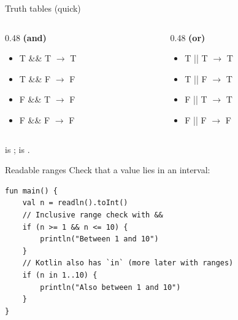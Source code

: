 \documentclass[aspectratio=169,11pt]{beamer}
\begin{document}
    \begin{frame}{Truth tables (quick)}
        \begin{columns}[T]
            \begin{column}{0.48\textwidth}
                \textbf{\kotlincode{\&\&} (and)}
                \begin{itemize}
                    \item T \&\& T $\rightarrow$ T
                    \item T \&\& F $\rightarrow$ F
                    \item F \&\& T $\rightarrow$ F
                    \item F \&\& F $\rightarrow$ F
                \end{itemize}
            \end{column}
            \begin{column}{0.48\textwidth}
                \textbf{\kotlincode{||} (or)}
                \begin{itemize}
                    \item T || T $\rightarrow$ T
                    \item T || F $\rightarrow$ T
                    \item F || T $\rightarrow$ T
                    \item F || F $\rightarrow$ F
                \end{itemize}
            \end{column}
        \end{columns}
        \vspace{0.6em}
         is ;  is .
    \end{frame}

    \begin{frame}[fragile]{Readable ranges}
        Check that a value lies in an interval:
        \vspace{0.3em}
        \begin{lstlisting}
fun main() {
    val n = readln().toInt()
    // Inclusive range check with &&
    if (n >= 1 && n <= 10) {
        println("Between 1 and 10")
    }
    // Kotlin also has `in` (more later with ranges)
    if (n in 1..10) {
        println("Also between 1 and 10")
    }
}
        \end{lstlisting}
    \end{frame}
\end{document}
